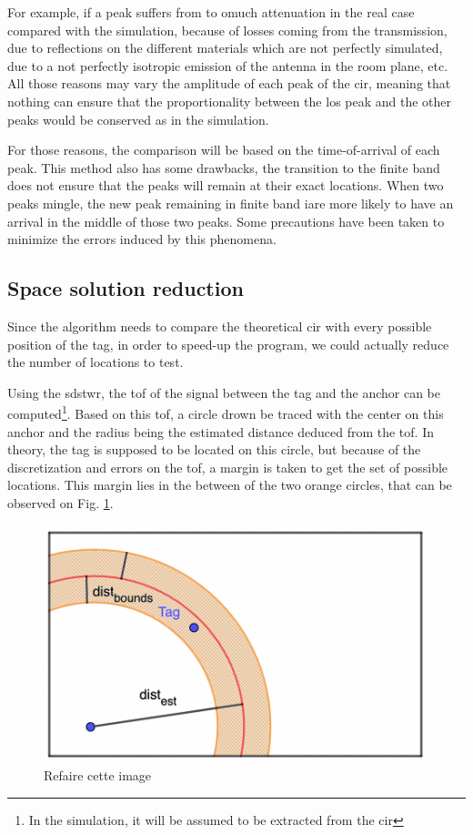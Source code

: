For example, if a peak suffers from to omuch attenuation in the real case compared with the simulation, because of losses coming from the transmission, due to reflections on the different materials which are not perfectly simulated, due to a not perfectly isotropic emission of the antenna in the room plane, etc. All those reasons may vary the amplitude of each peak of the \gls{cir}, meaning that nothing can ensure that the proportionality between the \gls{los} peak and the other peaks would be conserved as in the simulation.
\vspace{2mm}

For those reasons, the comparison will be based on the time-of-arrival of each peak. This method also has some drawbacks, the transition to the finite band does not ensure that the peaks will remain at their exact locations. When two peaks mingle, the new peak remaining in finite band iare more likely to have an arrival in the middle of those two peaks. Some precautions have been taken to minimize the errors induced by this phenomena.
\vspace{2mm}

\subsection{Space solution reduction}

Since the algorithm needs to compare the theoretical \gls{cir} with every possible position of the tag, in order to speed-up the program, we could actually reduce the number of locations to test.
\vspace{2mm}

Using the \gls{sdstwr}, the \gls{tof} of the signal between the tag and the anchor can be computed\footnote{In the simulation, it will be assumed to be extracted from the \gls{cir}}. Based on this \gls{tof}, a circle drown be traced with the center on this anchor and the radius being the estimated distance deduced from the \gls{tof}. In theory, the tag is supposed to be located on this circle, but because of the discretization and errors on the \gls{tof}, a margin is taken to get the set of possible locations. This margin lies in the between of the two orange circles, that can be observed on Fig. \ref{fig:speedup_1}.
\vspace{2mm}

\begin{figure}[H]
\centering
\includegraphics[width=.65\linewidth]{Images/algo_1.png}
\caption{\color{red} Refaire cette image \color{black}}
\label{fig:speedup_1}
\end{figure}

